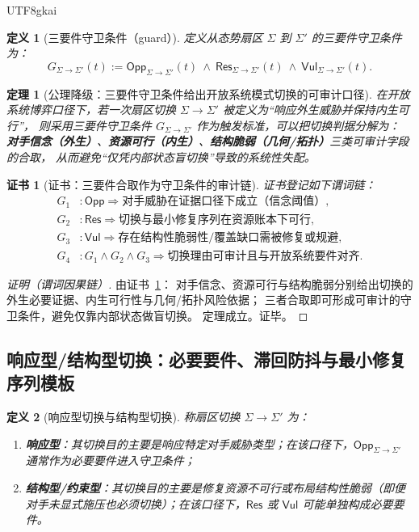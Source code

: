 \documentclass[12pt]{article}
\newtheorem{definition}{定义}[section]
\newtheorem{theorem}{定理}[section]
\newtheorem{Certificate}{证书}[section]
\begin{document}
\begin{CJK*}{UTF8}{gkai}
\begin{definition}[三要件守卫条件（guard）]
定义从态势扇区 $\Sigma$ 到 $\Sigma'$ 的三要件守卫条件为：
\[
  G_{\Sigma\to\Sigma'}(t)
  :=
  \mathsf{Opp}_{\Sigma\to\Sigma'}(t)
  \ \wedge\
  \mathsf{Res}_{\Sigma\to\Sigma'}(t)
  \ \wedge\
  \mathsf{Vul}_{\Sigma\to\Sigma'}(t).
\]
\end{definition}

\begin{theorem}[公理降级：三要件守卫条件给出开放系统模式切换的可审计口径]
\label{thm:openra-guard-three-criteria}
在开放系统博弈口径下，若一次扇区切换 $\Sigma\to\Sigma'$ 被定义为“响应外生威胁并保持内生可行”，
则采用三要件守卫条件 $G_{\Sigma\to\Sigma'}$ 作为触发标准，可以把切换判据分解为：
\textbf{对手信念（外生）}、\textbf{资源可行（内生）}、\textbf{结构脆弱（几何/拓扑）}三类可审计字段的合取，
从而避免“仅凭内部状态盲切换”导致的系统性失配。
\end{theorem}

\begin{Certificate}[证书：三要件合取作为守卫条件的审计链]
\label{cert:openra-guard-three-criteria}
证书登记如下谓词链：
\[
\begin{aligned}
  G_1 &: \mathsf{Opp}\Rightarrow \text{对手威胁在证据口径下成立（信念阈值）},\\
  G_2 &: \mathsf{Res}\Rightarrow \text{切换与最小修复序列在资源账本下可行},\\
  G_3 &: \mathsf{Vul}\Rightarrow \text{存在结构性脆弱性/覆盖缺口需被修复或规避},\\
  G_4 &: G_1\wedge G_2\wedge G_3 \Rightarrow \text{切换理由可审计且与开放系统要件对齐}.
\end{aligned}
\]
\end{Certificate}

\begin{proof}[证明（谓词因果链）]
由证书~\ref{cert:openra-guard-three-criteria}：
对手信念、资源可行与结构脆弱分别给出切换的外生必要证据、内生可行性与几何/拓扑风险依据；
三者合取即可形成可审计的守卫条件，避免仅靠内部状态做盲切换。
定理成立。证毕。
\end{proof}

\subsection{响应型/结构型切换：必要要件、滞回防抖与最小修复序列模板}
\label{sec:openra-switch-guard-templates}

\begin{definition}[响应型切换与结构型切换]
称扇区切换 $\Sigma\to\Sigma'$ 为：
\begin{enumerate}
  \item \textbf{响应型}：其切换目的主要是响应特定对手威胁类型；在该口径下，$\mathsf{Opp}_{\Sigma\to\Sigma'}$ 通常作为必要要件进入守卫条件；
  \item \textbf{结构型/约束型}：其切换目的主要是修复资源不可行或布局结构性脆弱（即便对手未显式施压也必须切换）；在该口径下，$\mathsf{Res}$ 或 $\mathsf{Vul}$ 可能单独构成必要要件。
\end{enumerate}
\end{definition}


\end{CJK*}
\end{document}
